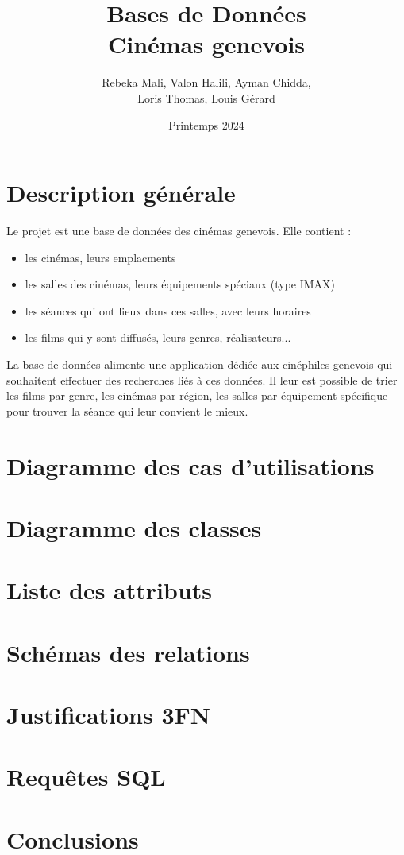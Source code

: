 \documentclass[12pt]{article}
\title{Bases de Données \\ Cinémas genevois}
\author{Rebeka Mali, Valon Halili, Ayman Chidda,\\ Loris Thomas, Louis Gérard}
\date{Printemps 2024}
\begin{document}
\maketitle

\section{Description générale}
Le projet est une base de données des cinémas genevois. Elle contient : 
\begin{itemize}
    \item les cinémas, leurs emplacments
    \item les salles des cinémas, leurs équipements spéciaux (type IMAX)
    \item les séances qui ont lieux dans ces salles, avec leurs horaires
    \item les films qui y sont diffusés, leurs genres, réalisateurs...
\end{itemize}
La base de données alimente une application dédiée aux cinéphiles genevois qui souhaitent
effectuer des recherches liés à ces données. Il leur est possible de trier les films par genre,
les cinémas par région, les salles par équipement spécifique pour trouver la séance qui leur convient le mieux.
\pagebreak
\section{Diagramme des cas d'utilisations}
\pagebreak
\section{Diagramme des classes}
\pagebreak
\section{Liste des attributs}
\pagebreak
\section{Schémas des relations}
\pagebreak
\section{Justifications 3FN}
\pagebreak
\section{Requêtes SQL}
\pagebreak
\section{Conclusions}
\end{document}

